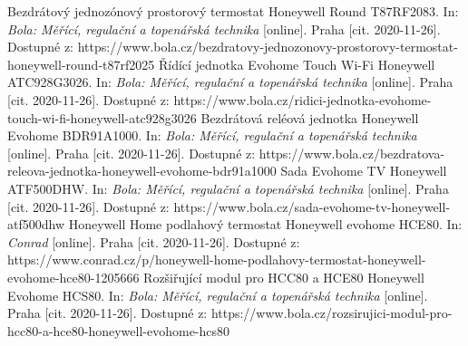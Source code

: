 \begin{thebibliography}{3}
Bezdrátový jednozónový prostorový termostat Honeywell Round T87RF2083. In: \textit{Bola: Měřící, regulační a topenářská technika} [online]. Praha [cit. 2020-11-26]. Dostupné z: https://www.bola.cz/bezdratovy-jednozonovy-prostorovy-termostat-honeywell-round-t87rf2025
Řídící jednotka Evohome Touch Wi-Fi Honeywell ATC928G3026. In: \textit{Bola: Měřící, regulační a topenářská technika} [online]. Praha [cit. 2020-11-26]. Dostupné z: https://www.bola.cz/ridici-jednotka-evohome-touch-wi-fi-honeywell-atc928g3026
Bezdrátová reléová jednotka Honeywell Evohome BDR91A1000. In: \textit{Bola: Měřící, regulační a topenářská technika} [online]. Praha [cit. 2020-11-26]. Dostupné z: https://www.bola.cz/bezdratova-releova-jednotka-honeywell-evohome-bdr91a1000
Sada Evohome TV Honeywell ATF500DHW. In: \textit{Bola: Měřící, regulační a topenářská technika} [online]. Praha [cit. 2020-11-26]. Dostupné z: https://www.bola.cz/sada-evohome-tv-honeywell-atf500dhw
Honeywell Home podlahový termostat Honeywell evohome HCE80. In: \textit{Conrad} [online]. Praha [cit. 2020-11-26]. Dostupné z: https://www.conrad.cz/p/honeywell-home-podlahovy-termostat-honeywell-evohome-hce80-1205666
Rozšiřující modul pro HCC80 a HCE80 Honeywell Evohome HCS80. In: \textit{Bola: Měřící, regulační a topenářská technika} [online]. Praha [cit. 2020-11-26]. Dostupné z: https://www.bola.cz/rozsirujici-modul-pro-hcc80-a-hce80-honeywell-evohome-hcs80


\end{thebibliography}
